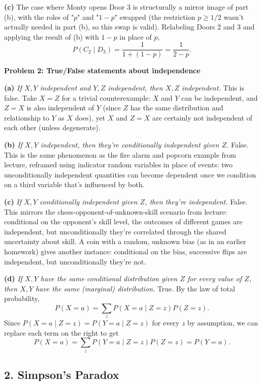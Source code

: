 \documentclass{article}
\begin{document}
\medskip
\textbf{(c)} The case where Monty opens Door 3 is structurally a mirror image of part (b), with the roles of "$p$" and "$1-p$" swapped (the restriction $p\ge 1/2$ wasn't actually needed in part (b), so this swap is valid). Relabeling Doors 2 and 3 and applying the result of (b) with $1-p$ in place of $p$,
$$
P(C_2\mid D_3) = \frac{1}{1+(1-p)} = \frac{1}{2-p}.
$$

\bigskip
\textbf{Problem 2: True/False statements about independence}

\textbf{(a)} \emph{If $X,Y$ independent and $Y,Z$ independent, then $X,Z$ independent.} This is false. Take $X=Z$ for a trivial counterexample: $X$ and $Y$ can be independent, and $Z=X$ is also independent of $Y$ (since $Z$ has the same distribution and relationship to $Y$ as $X$ does), yet $X$ and $Z=X$ are certainly not independent of each other (unless degenerate).

\medskip
\textbf{(b)} \emph{If $X,Y$ independent, then they're conditionally independent given $Z$.} False. This is the same phenomenon as the fire alarm and popcorn example from lecture, reframed using indicator random variables in place of events: two unconditionally independent quantities can become dependent once we condition on a third variable that's influenced by both.

\medskip
\textbf{(c)} \emph{If $X,Y$ conditionally independent given $Z$, then they're independent.} False. This mirrors the chess-opponent-of-unknown-skill scenario from lecture: conditional on the opponent's skill level, the outcomes of different games are independent, but unconditionally they're correlated through the shared uncertainty about skill. A coin with a random, unknown bias (as in an earlier homework) gives another instance: conditional on the bias, successive flips are independent, but unconditionally they're not.

\medskip
\textbf{(d)} \emph{If $X,Y$ have the same conditional distribution given $Z$ for every value of $Z$, then $X,Y$ have the same (marginal) distribution.} True. By the law of total probability,
$$
P(X=a) = \sum_z P(X=a\mid Z=z)P(Z=z).
$$
Since $P(X=a\mid Z=z)=P(Y=a\mid Z=z)$ for every $z$ by assumption, we can replace each term on the right to get
$$
P(X=a) = \sum_z P(Y=a\mid Z=z)P(Z=z) = P(Y=a).
$$

\subsection*{2. Simpson's Paradox}
\end{document}
